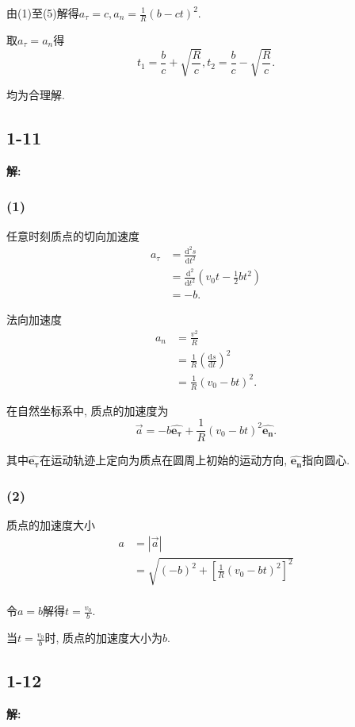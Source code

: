 \documentclass[twocolumn]{ctexart}
\begin{document}
由(1)至(5)解得$\displaystyle{a_\tau=c,a_n=\frac{1}{R}\left(b-ct\right)^2}$. 

取$a_\tau=a_n$得 
$$t_1=\frac{b}{c}+\sqrt{\frac{R}{c}},t_2=\frac{b}{c}-\sqrt{\frac{R}{c}}.$$ 

均为合理解. 
\subsection*{1-11} 
\noindent 
\textbf{解:} 
\subsubsection*{(1)} 
任意时刻质点的切向加速度 
\begin{align*} 
a_\tau&=\frac{\mathrm{d}^2s}{\mathrm{d}t^2}\\ 
&=\frac{\mathrm{d}^2}{\mathrm{d}t^2}\left(v_0t-\frac{1}{2}bt^2\right)\\ 
&=-b. 
\end{align*} 

法向加速度 
\begin{align*} 
a_n&=\frac{v^2}{R}\\ 
&=\frac{1}{R}\left(\frac{\mathrm{d}s}{\mathrm{d}t}\right)^2\\ 
&=\frac{1}{R}\left(v_0-bt\right)^2. 
\end{align*} 

在自然坐标系中, 质点的加速度为 
$$\vec{a}=-b\hat{\mathbf{e_\tau}}+\frac{1}{R}\left(v_0-bt\right)^2\hat{\mathbf{e_n}}.$$ 

其中$\hat{\mathbf{e_\tau}}$在运动轨迹上定向为质点在圆周上初始的运动方向, $\hat{\mathbf{e_n}}$指向圆心. 
\subsubsection*{(2)} 
质点的加速度大小 
\begin{align*} 
a&=\left|\vec{a}\right|\\ 
&=\sqrt{\left(-b\right)^2+{\left[\frac{1}{R}\left(v_0-bt\right)^2\right]}^2}\\  
\end{align*} 

令$a=b$解得$\displaystyle{t=\frac{v_0}{b}}$.

当$\displaystyle{t=\frac{v_0}{b}}$时, 质点的加速度大小为$b$. 
\subsection*{1-12} 
\noindent 
\textbf{解:} 
\end{document}
